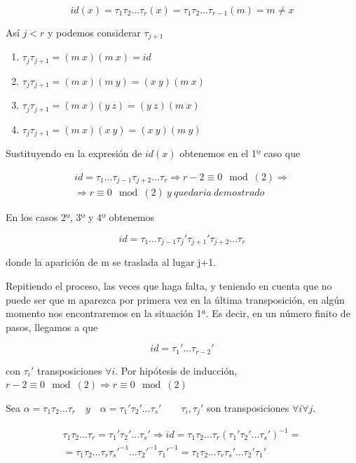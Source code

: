 \documentclass{article}
\begin{document}
\begin{equation*}
id(x)=\tau_1\tau_2\ldots\tau_r(x)=\tau_1\tau_2\ldots\tau_{r-1}(m)=m\neq x
\end{equation*}

Así $j<r$ y podemos considerar $\tau_{j+1}$

\begin{enumerate}
\item $\tau_j\tau_{j+1}=(m\:x)(m\:x)=id$
\item $\tau_j\tau_{j+1}=(m\:x)(m\:y)=(x\:y)(m\:x)$
\item $\tau_j\tau_{j+1}=(m\:x)(y\:z)=(y\:z)(m\:x)$
\item $\tau_j\tau_{j+1}=(m\:x)(x\:y)=(x\:y)(m\:y)$
\end{enumerate}

Sustituyendo en la expresión de $id(x)$ obtenemos en el 1º caso que 

\begin{gather*}
id=\tau_1\ldots\tau_{j-1}\tau_{j+2}\ldots\tau_r \Rightarrow r-2 \equiv 0 \mod{(2)} \Rightarrow \\
\Rightarrow r \equiv 0 \mod{(2)}\:y\:quedaria\:demostrado
\end{gather*}

En los casos 2º, 3º y 4º obtenemos

\begin{equation*}
id=\tau_1\ldots\tau_{j-1}\tau_j'\tau_{j+1}'\tau_{j+2}\ldots\tau_r
\end{equation*}

donde la aparición de m se traslada al lugar j+1.

Repitiendo el proceso, las veces que haga falta, y teniendo en cuenta que no puede ser que m aparezca por primera vez en la última transposición, en algún momento nos encontraremos en la situación 1ª. Es decir, en un número finito de pasos, llegamos a que 

\begin{equation*}
id=\tau_1'\ldots\tau_{r-2}'
\end{equation*}

con $\tau_i'$ transposiciones $\forall i$. Por hipótesis de inducción, $r-2\equiv 0 \mod{(2)} \Rightarrow r \equiv 0 \mod{(2)}$

Sea $\alpha=\tau_1\tau_2\ldots\tau_r\quad y \quad\alpha=\tau_1'\tau_2'\ldots\tau_s' \qquad \tau_i,\tau_j'$ son transposiciones $\forall i \forall j$.

\begin{gather*}
\tau_1\tau_2\ldots\tau_r=\tau_1'\tau_2'\ldots\tau_s'\Rightarrow id=\tau_1\tau_2\ldots\tau_r(\tau_1'\tau_2'\ldots\tau_s')^{-1}= \\
=\tau_1\tau_2\ldots\tau_r\tau_s'^{-1}\ldots\tau_2'^{-1}\tau_1'^{-1}=\tau_1\tau_2\ldots\tau_r\tau_s'\ldots\tau_2'\tau_1'
\end{gather*}
\end{document}
